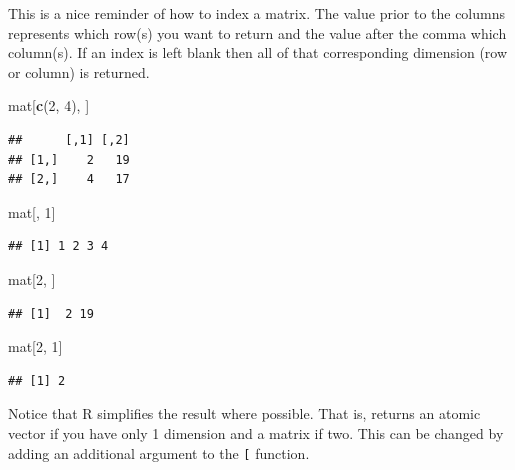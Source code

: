 \documentclass[
]{book}
\newenvironment{Shaded}{\begin{snugshade}}{\end{snugshade}}
\newcommand{\DecValTok}[1]{\textcolor[rgb]{0.00,0.00,0.81}{#1}}
\newcommand{\KeywordTok}[1]{\textcolor[rgb]{0.13,0.29,0.53}{\textbf{#1}}}
\newcommand{\NormalTok}[1]{#1}
\theoremstyle{definition}
\theoremstyle{definition}
\theoremstyle{definition}
\theoremstyle{remark}
\begin{document}
This is a nice reminder of how to index a matrix. The value prior to the columns represents which row(s) you want to return and the value after the comma which column(s). If an index is left blank then all of that corresponding dimension (row or column) is returned.

\begin{Shaded}
\begin{Highlighting}[]
\NormalTok{mat[}\KeywordTok{c}\NormalTok{(}\DecValTok{2}\NormalTok{, }\DecValTok{4}\NormalTok{), ]}
\end{Highlighting}
\end{Shaded}

\begin{verbatim}
##      [,1] [,2]
## [1,]    2   19
## [2,]    4   17
\end{verbatim}

\begin{Shaded}
\begin{Highlighting}[]
\NormalTok{mat[, }\DecValTok{1}\NormalTok{]}
\end{Highlighting}
\end{Shaded}

\begin{verbatim}
## [1] 1 2 3 4
\end{verbatim}

\begin{Shaded}
\begin{Highlighting}[]
\NormalTok{mat[}\DecValTok{2}\NormalTok{, ]}
\end{Highlighting}
\end{Shaded}

\begin{verbatim}
## [1]  2 19
\end{verbatim}

\begin{Shaded}
\begin{Highlighting}[]
\NormalTok{mat[}\DecValTok{2}\NormalTok{, }\DecValTok{1}\NormalTok{]}
\end{Highlighting}
\end{Shaded}

\begin{verbatim}
## [1] 2
\end{verbatim}

Notice that R simplifies the result where possible. That is, returns an atomic vector if you have only 1 dimension and a matrix if two. This can be changed by adding an additional argument to the \texttt{{[}} function.
\end{document}

